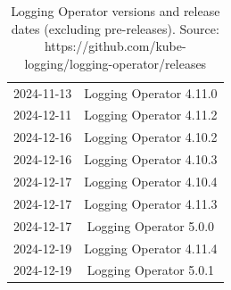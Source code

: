 \documentclass[../main.tex]{subfiles}
\begin{document}
\begin{table}[h]
\begin{tabular}{|c|c|}
        2024-11-13 & Logging Operator 4.11.0 \\
        2024-12-11 & Logging Operator 4.11.2 \\
        2024-12-16 & Logging Operator 4.10.2 \\
        2024-12-16 & Logging Operator 4.10.3 \\
        2024-12-17 & Logging Operator 4.10.4 \\
        2024-12-17 & Logging Operator 4.11.3 \\
        2024-12-17 & Logging Operator 5.0.0 \\
        2024-12-19 & Logging Operator 4.11.4 \\
        2024-12-19 & Logging Operator 5.0.1 \\
        \hline
    \end{tabular}
   \caption{Logging Operator versions and release dates (excluding pre-releases). Source: https://github.com/kube-logging/logging-operator/releases}
   \label{tab:logging_operator_versions}
\end{table}
\end{document}
